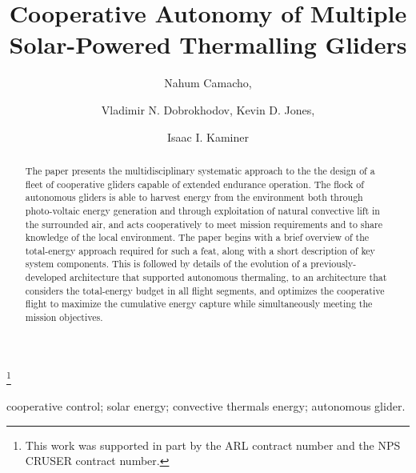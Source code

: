 \documentclass{ifacconf}
\begin{document}
\begin{frontmatter}

\title{Cooperative Autonomy of Multiple Solar-Powered Thermalling Gliders }

\thanks[footnoteinfo]{This work was supported in part by the ARL contract number and the NPS CRUSER contract number.}

\author[First]{Nahum Camacho,}
\author[Second]{Vladimir N. Dobrokhodov, Kevin D. Jones,}
\author[Third]{Isaac I. Kaminer}

\address[First]{Graduate student at the Department  of Mechanical and Aerospace Engineering, Naval Postgraduate School, Monterey, CA 93943 USA (\tt\small e-mail: ncamacho@nps.edu)}
\address[Second]{Associate Professors at the Department  of Mechanical and Aerospace Engineering, Naval Postgraduate School, Monterey, CA 93943 USA (\tt\small e-mail: vndobrok@nps.edu, kdjones@nps.edu)}
\address[Third]{Professor at the Department  of Mechanical and Aerospace Engineering, Naval Postgraduate School, Monterey, CA 93943 USA (\tt\small e-mail: kaminer@nps.edu)}


\begin{keyword}                           %
cooperative control; solar energy; convective thermals energy; autonomous glider.
\end{keyword}                             %


\begin{abstract}                          %
The paper presents the multidisciplinary systematic approach to the the design of a fleet of cooperative gliders capable of extended endurance operation. The flock of autonomous gliders is able to harvest energy from the environment both through photo-voltaic energy generation and through exploitation of natural convective lift in the surrounded air, and acts cooperatively to meet mission requirements and to share knowledge of the local environment. The paper begins with a brief overview of the total-energy approach required for such a feat, along with a short description of key system components. This is followed by details of the evolution of a previously-developed architecture that supported autonomous thermaling, to an architecture that considers the total-energy budget in all flight segments, and optimizes the cooperative flight to maximize the  cumulative energy capture while simultaneously meeting the mission objectives.
\end{abstract}

\end{frontmatter}
\end{document}
